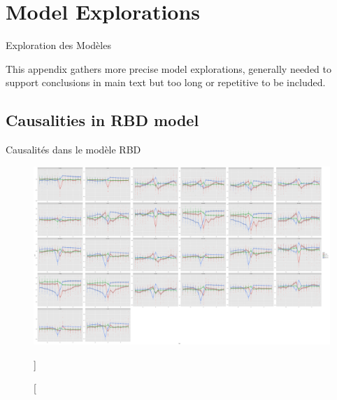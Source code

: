 \chapter{Model Explorations}{Exploration des Modèles} %

\label{app:exploration} %



This appendix gathers more precise model explorations, generally needed to support conclusions in main text but too long or repetitive to be included.






\section{Causalities in RBD model}{Causalités dans le modèle RBD}



\begin{figure}
\includegraphics[height=\textwidth,angle=90]{Figures/SynthRBD/laggedcorrs_facet.png}
\caption[][]{}{}
\end{figure}




